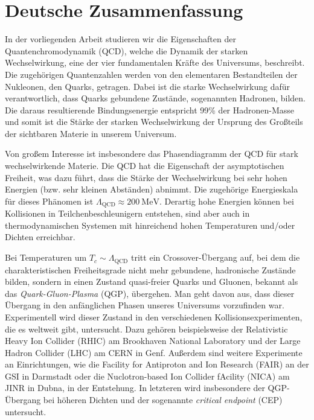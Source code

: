 \begingroup%
\let\clearpage\relax%
\let\cleardoublepage\relax%
\fontsize{12pt}{18pt}\selectfont

\chapter*{Deutsche Zusammenfassung}

In der vorliegenden Arbeit studieren wir die Eigenschaften der
Quantenchromodynamik (QCD), welche die Dynamik der starken Wechselwirkung, eine
der vier fundamentalen Kräfte des Universums, beschreibt. Die zugehörigen
Quantenzahlen werden von den elementaren Bestandteilen der Nukleonen, den
Quarks, getragen. Dabei ist die starke Wechselwirkung dafür verantwortlich, dass
Quarks gebundene Zustände, sogenannten Hadronen, bilden. Die daraus
resultierende Bindungsenergie entspricht 99\% der Hadronen-Mas\-se und somit ist
die Stärke der starken Wechselwirkung der Ursprung des Groß\-teils der
sichtbaren Materie in unserem Universum.

Von großem Interesse ist insbesondere das Phasendiagramm der QCD für stark
wechselwirkende Materie. Die QCD hat die Eigenschaft der asymptotischen
Freiheit, was dazu führt, dass die Stärke der Wechselwirkung bei sehr hohen
Energien (bzw. sehr kleinen Abständen) abnimmt. Die zugehörige Energieskala für
dieses Phänomen ist $\Lambda_{\mathrm{QCD}} \approx 200 \:\mathrm{MeV}$. Derartig
hohe Energien können bei Kollisionen in Teilchenbeschleunigern entstehen, sind
aber auch in thermodynamischen Systemen mit hinreichend hohen Temperaturen
und/oder Dichten erreichbar.

Bei Temperaturen um $T_c \sim \Lambda_{\mathrm{QCD}}$ tritt ein
Crossover-Übergang auf, bei dem die charakteristischen Freiheitsgrade nicht mehr
gebundene, hadronische Zustände bilden, sondern in einen Zustand quasi-freier
Quarks und Gluonen, bekannt als das \emph{Quark-Gluon-Plasma} (QGP), übergehen.
Man geht davon aus, dass dieser Übergang in den anfänglichen Phasen unseres
Universums vorzufinden war. Experimentell wird dieser Zustand in den
verschiedenen Kollisionsexperimenten, die es weltweit gibt, untersucht. Dazu
gehören beispielsweise der Relativistic Heavy Ion Collider (RHIC) am Brookhaven
National Laboratory und der Large Hadron Collider (LHC) am CERN in Genf.
Außerdem sind weitere Experimente an Einrichtungen, wie die Facility for
Antiproton and Ion Research (FAIR) an der GSI in Darmstadt oder die
Nuclotron-based Ion Collider fAcility (NICA) am JINR in Dubna, in der
Entstehung. In letzteren wird insbesondere der QGP-Übergang bei höheren Dichten
und der sogenannte \emph{critical endpoint} (CEP) untersucht.

